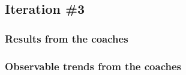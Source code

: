 \subsection{Iteration \#3}


    \subsubsection{Results from the coaches}

    \subsubsection{Observable trends from the coaches}
